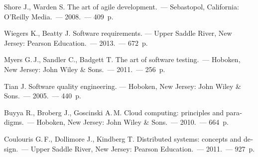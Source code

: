 \documentclass[a4paper,10pt]{article}
\begin{document}
\begin{thebibliography}{99}
\begin{otherlanguage}{english}
    Shore J., Warden S.
	The art of agile development.~— Sebastopol, California: O’Reilly Media.~— 2008.~— 409~p.

    Wiegers K., Beatty J.
	Software requirements. — Upper Saddle River, New Jersey: Pearson Education.~— 2013.~— 672~p.

    Myers G.\,J., Sandler C., Badgett T.
	The art of software testing.~— Hoboken, New Jersey: John Wiley \& Sons.~— 2011.~— 256~p.

    Tian J.
	Software quality engineering. — Hoboken, New Jersey: John Wiley \& Sons.~— 2005.~— 440~p.

    Buyya R., Broberg J., Goscinski A.\,M.
	Cloud computing: principles and paradigms.~— Hoboken, New Jersey: John Wiley \& Sons.~— 2010.~— 664~p.

    Coulouris G.\,F., Dollimore J., Kindberg T.
	Distributed systems: concepts and design.~— Upper Saddle River, New Jersey: Pearson Education.~— 2011.~— 927~p.
	\end{otherlanguage}
\end{thebibliography}
\end{document}
